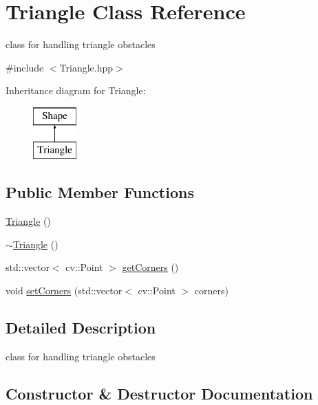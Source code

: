 \hypertarget{class_triangle}{}\section{Triangle Class Reference}
\label{class_triangle}


class for handling triangle obstacles  




{\ttfamily \#include $<$Triangle.\+hpp$>$}

Inheritance diagram for Triangle\+:\begin{figure}[H]
\begin{center}
\leavevmode
\includegraphics[height=2.000000cm]{class_triangle}
\end{center}
\end{figure}
\subsection*{Public Member Functions}
\begin{DoxyCompactItemize}
\item 
\mbox{\hyperlink{class_triangle_aaefe4ed500c07918d30c6f0e286332c5}{Triangle}} ()
\item 
\mbox{\hyperlink{class_triangle_a5199760a17454f4dc94c855a57e3a152}{$\sim$\+Triangle}} ()
\item 
std\+::vector$<$ cv\+::\+Point $>$ \mbox{\hyperlink{class_triangle_a0c77555fd0e47f1344c23fa880f43777}{get\+Corners}} ()
\item 
void \mbox{\hyperlink{class_triangle_ad2d4cecee7e87e10d8b2787199d784c2}{set\+Corners}} (std\+::vector$<$ cv\+::\+Point $>$ corners)
\end{DoxyCompactItemize}


\subsection{Detailed Description}
class for handling triangle obstacles 

\subsection{Constructor \& Destructor Documentation}
\mbox{\label{class_triangle_aaefe4ed500c07918d30c6f0e286332c5}} 
